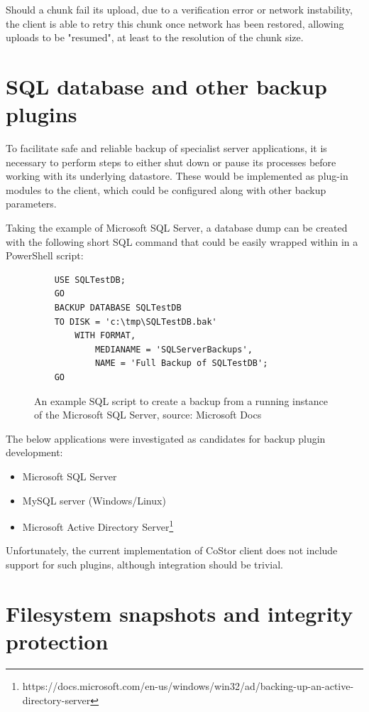 \documentclass[bsc,frontabs,twoside,singlespacing,parskip,deptreport]{infthesis}     %
\begin{document}
Should a chunk fail its upload, due to a verification error or network instability, the client
is able to retry this chunk once network has been restored, allowing uploads to be "resumed", at 
least to the resolution of the chunk size.

\section{SQL database and other backup plugins}

To facilitate safe and reliable backup of specialist server applications, it is necessary to perform
steps to either shut down or pause its processes before working with its underlying datastore. 
These would be implemented as plug-in modules to the client, which could be configured along
with other backup parameters.

Taking the example of Microsoft SQL Server, a database dump can be created with the following 
short SQL command that could be easily wrapped within in a PowerShell script:

\begin{figure}[h]
	\begin{verbatim}
	USE SQLTestDB;
	GO
	BACKUP DATABASE SQLTestDB
	TO DISK = 'c:\tmp\SQLTestDB.bak'
   		WITH FORMAT,
      		MEDIANAME = 'SQLServerBackups',
      		NAME = 'Full Backup of SQLTestDB';
	GO
	\end{verbatim}
	\caption{An example SQL script to create a backup from a running instance of the Microsoft SQL Server, source: Microsoft Docs\cite{mssql}}
\end{figure}

The below applications were investigated as candidates for backup plugin development:

\begin{itemize}
	\item Microsoft SQL Server
	\item MySQL server (Windows/Linux)
	\item Microsoft Active Directory Server\footnote{https://docs.microsoft.com/en-us/windows/win32/ad/backing-up-an-active-directory-server}
\end{itemize}

Unfortunately, the current implementation of CoStor client does not include support for such plugins, 
although integration should be trivial.

\section{Filesystem snapshots and integrity protection}
\end{document}

